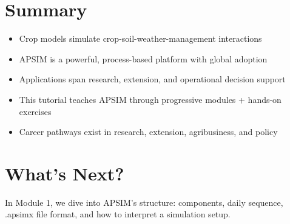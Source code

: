 \section{Summary}

\begin{itemize}
  \item Crop models simulate crop-soil-weather-management interactions
  \item APSIM is a powerful, process-based platform with global adoption
  \item Applications span research, extension, and operational decision support
  \item This tutorial teaches APSIM through progressive modules + hands-on exercises
  \item Career pathways exist in research, extension, agribusiness, and policy
\end{itemize}

\section{What's Next?}

In Module 1, we dive into APSIM's structure: components, daily sequence, .apsimx file format, and how to interpret a simulation setup.

